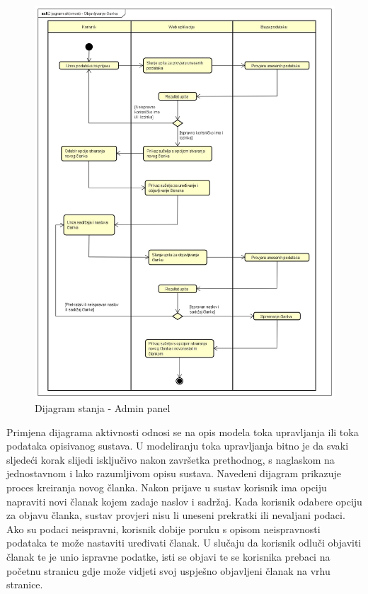 \begin{figure}[H]
	\includegraphics[scale=0.4]{slike/dijagram-aktivnosti.jpeg}
	\centering
	\caption{Dijagram stanja - Admin panel}
	\label{fig:activity_diagram}
\end{figure}

Primjena dijagrama aktivnosti odnosi se na opis modela toka upravljanja ili 
toka podataka opisivanog sustava. U modeliranju toka upravljanja bitno je da 
svaki sljedeći korak slijedi isključivo nakon završetka prethodnog, s 
naglaskom na jednostavnom i lako razumljivom opisu sustava. Navedeni dijagram 
prikazuje proces kreiranja novog članka. Nakon prijave u sustav korisnik ima 
opciju napraviti novi članak kojem zadaje naslov i sadržaj. Kada korisnik 
odabere opciju za objavu članka, sustav provjeri nisu li uneseni prekratki ili 
nevaljani podaci. Ako su podaci neispravni, korisnik dobije poruku s opisom 
neispravnosti podataka te može nastaviti uređivati članak. U slučaju da 
korisnik odluči objaviti članak te je unio ispravne podatke, isti se objavi te 
se korisnika prebaci na početnu stranicu gdje može vidjeti svoj uspješno 
objavljeni članak na vrhu stranice.

